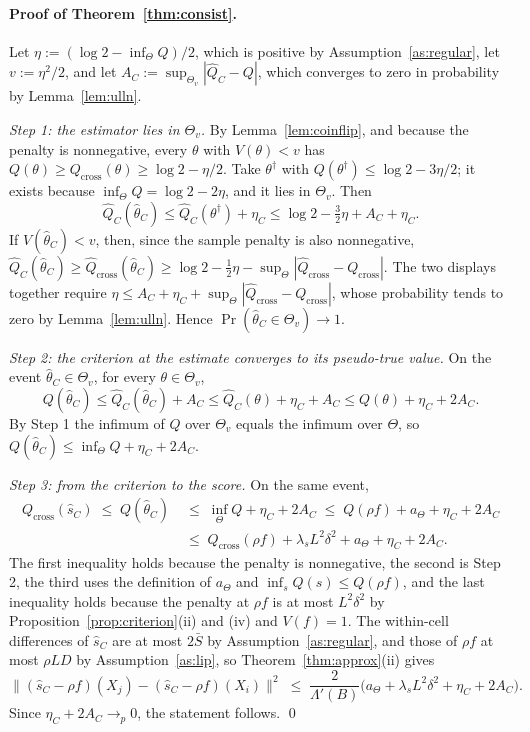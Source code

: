 \documentclass[11pt]{article}
\theoremstyle{remark}
\newcommand{\Qc}{Q_{\mathrm{cross}}}
\newcommand{\Qt}{Q}
\newcommand{\Qch}{\hat{Q}_{\mathrm{cross}}}
\newcommand{\Qth}{\hat{Q}}
\begin{document}
\paragraph{Proof of Theorem~\ref{thm:consist}.} Let $\eta := (\log 2 - \inf_\Theta\Qt)/2$, which is
positive by Assumption~\ref{as:regular}, let $v := \eta^{2}/2$, and let
$A_C := \sup_{\Theta_v}|\Qth_C - \Qt|$, which converges to zero in probability by Lemma~\ref{lem:ulln}.

\emph{Step 1: the estimator lies in $\Theta_v$.} By Lemma~\ref{lem:coinflip}, and because the penalty is
nonnegative, every $\theta$ with $V(\theta) < v$ has $\Qt(\theta) \ge \Qc(\theta) \ge \log 2 - \eta/2$.
Take $\theta^{\dagger}$ with $\Qt(\theta^{\dagger}) \le \log 2 - 3\eta/2$; it exists because
$\inf_\Theta\Qt = \log 2 - 2\eta$, and it lies in $\Theta_v$. Then
\[
    \Qth_C(\hat\theta_C) \le \Qth_C(\theta^{\dagger}) + \eta_C
    \le \log 2 - \tfrac32\eta + A_C + \eta_C .
\]
If $V(\hat\theta_C) < v$, then, since the sample penalty is also nonnegative,
$\Qth_C(\hat\theta_C) \ge \Qch(\hat\theta_C) \ge \log 2 - \tfrac12\eta - \sup_\Theta|\Qch - \Qc|$. The
two displays together require $\eta \le A_C + \eta_C + \sup_\Theta|\Qch - \Qc|$, whose probability
tends to zero by Lemma~\ref{lem:ulln}. Hence $\Pr(\hat\theta_C\in\Theta_v) \to 1$.

\emph{Step 2: the criterion at the estimate converges to its pseudo-true value.} On the event
$\hat\theta_C\in\Theta_v$, for every $\theta \in \Theta_v$,
\[
    \Qt(\hat\theta_C) \le \Qth_C(\hat\theta_C) + A_C \le \Qth_C(\theta) + \eta_C + A_C
    \le \Qt(\theta) + \eta_C + 2A_C .
\]
By Step 1 the infimum of $\Qt$ over $\Theta_v$ equals the infimum over $\Theta$, so
$\Qt(\hat\theta_C) \le \inf_\Theta\Qt + \eta_C + 2A_C$.

\emph{Step 3: from the criterion to the score.} On the same event,
\begin{align*}
    \Qc(\hat{s}_C) \;\le\; \Qt(\hat{\theta}_C) \;&\le\; \inf_\Theta\Qt + \eta_C + 2A_C
    \;\le\; \Qt(\rho f) + a_\Theta + \eta_C + 2A_C \\
    &\le\; \Qc(\rho f) + \lambda_s L^2\delta^2 + a_\Theta + \eta_C + 2A_C .
\end{align*}
The first inequality holds because the penalty is nonnegative, the second is Step 2, the third uses the
definition of $a_\Theta$ and $\inf_s\Qt(s) \le \Qt(\rho f)$, and the last inequality holds because the penalty at $\rho f$ is at most
$L^{2}\delta^{2}$ by Proposition~\ref{prop:criterion}(ii) and (iv) and $V(f)=1$. The within-cell
differences of $\hat s_C$ are at most $2\bar S$ by Assumption~\ref{as:regular}, and those of $\rho f$ at
most $\rho LD$ by Assumption~\ref{as:lip}, so Theorem~\ref{thm:approx}(ii) gives
\[
    \big\|(\hat s_C - \rho f)(X_j)-(\hat s_C - \rho f)(X_i)\big\|^{2} \;\le\;
    \frac{2}{\Lambda'(B)}\big(a_\Theta + \lambda_s L^2\delta^2 + \eta_C + 2A_C\big).
\]
Since $\eta_C + 2A_C \to_p 0$, the statement follows. \qed
\end{document}
